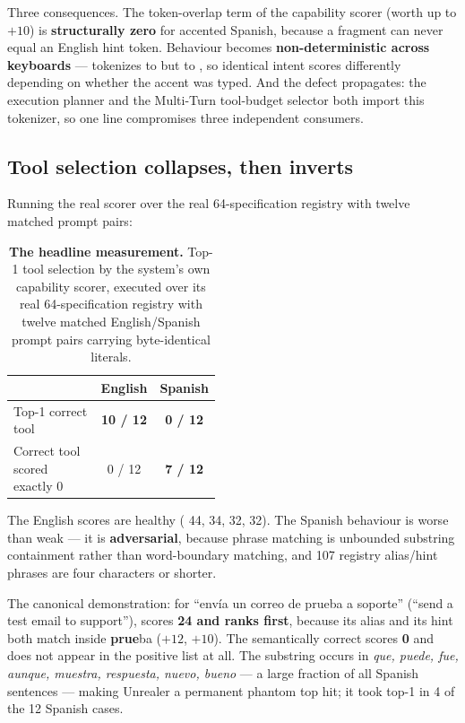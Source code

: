 Three consequences. The token-overlap term of the capability scorer (worth up to
$+10$) is \textbf{structurally zero} for accented Spanish, because a fragment can
never equal an English hint token. Behaviour becomes \textbf{non-deterministic
across keyboards} ---  tokenizes to \code{['ejecucion']} but
 to \code{['ejecuci']}, so identical intent scores differently
depending on whether the accent was typed. And the defect propagates: the
execution planner and the Multi-Turn tool-budget selector both import this
tokenizer, so one line compromises three independent consumers.

\subsection{Tool selection collapses, then inverts}
\label{sec:tool-selection}

Running the real scorer over the real 64-specification registry with twelve
matched prompt pairs:

\begin{table}[htbp]
\centering
\small
\caption{\textbf{The headline measurement.} Top-1 tool selection by the system's
own capability scorer, executed over its real 64-specification registry with
twelve matched English/Spanish prompt pairs carrying byte-identical literals.}
\label{tab:tool-selection-collapse}
\begin{tabular}{@{}p{0.46\linewidth}cc@{}}
\toprule
 & \textbf{English} & \textbf{Spanish} \\
\midrule
Top-1 correct tool          & \textbf{10 / 12} & \textbf{0 / 12} \\
Correct tool scored exactly 0 & 0 / 12         & \textbf{7 / 12} \\
\bottomrule
\end{tabular}
\end{table}

The English scores are healthy ( 44,  34,
 32,  32). The Spanish behaviour is worse than weak
--- it is \textbf{adversarial}, because phrase matching is unbounded substring
containment rather than word-boundary matching, and 107 registry alias/hint
phrases are four characters or shorter.

The canonical demonstration: for
\foreignlanguage{spanish}{``envía un correo de prueba a soporte''} (``send a test
email to support''),  scores \textbf{24 and ranks
first}, because its alias  and its hint  both match inside
\textbf{prue}ba ($+12$, $+10$). The semantically correct
 scores \textbf{0} and does not appear in the
positive list at all. The substring  occurs in \emph{que, puede, fue,
aunque, muestra, respuesta, nuevo, bueno} --- a large fraction of all Spanish
sentences --- making Unrealer a permanent phantom top hit; it took top-1 in 4 of
the 12 Spanish cases.

